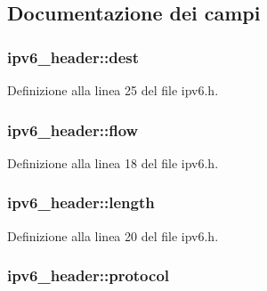 \subsection{Documentazione dei campi}
\hypertarget{structipv6__header_ae2c5d1ad1745ee57c4be6f9e5ed46511}{
\subsubsection[{dest}]{ ipv6\+\_\+header\+::dest}}\label{structipv6__header_ae2c5d1ad1745ee57c4be6f9e5ed46511}


Definizione alla linea 25 del file ipv6.\+h.

\hypertarget{structipv6__header_aa6ff2108b230be0d4bbafbc25ae7bc23}{
\subsubsection[{flow}]{ ipv6\+\_\+header\+::flow}}\label{structipv6__header_aa6ff2108b230be0d4bbafbc25ae7bc23}


Definizione alla linea 18 del file ipv6.\+h.

\hypertarget{structipv6__header_a20e60988c954fcd0ee95248930ed616a}{
\subsubsection[{length}]{ ipv6\+\_\+header\+::length}}\label{structipv6__header_a20e60988c954fcd0ee95248930ed616a}


Definizione alla linea 20 del file ipv6.\+h.

\hypertarget{structipv6__header_af41f2a0627f0f1dbd7e5fa905a090984}{
\subsubsection[{protocol}]{ ipv6\+\_\+header\+::protocol}}\label{structipv6__header_af41f2a0627f0f1dbd7e5fa905a090984}


